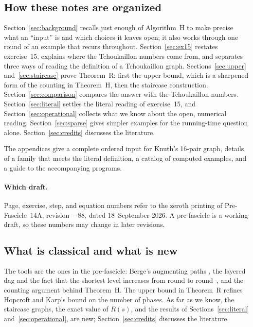 \subsection*{How these notes are organized}

Section~\ref{sec:background} recalls just enough of Algorithm~H to make
precise what an ``input'' is and which choices it leaves open; it
also works through one round of an example that recurs throughout.
Section~\ref{sec:ex15} restates exercise~15, explains where the
Tchoukaillon numbers come from, and separates three ways of reading the
definition of a Tchoukaillon graph. Sections~\ref{sec:upper}
and~\ref{sec:staircase} prove Theorem~R: first the upper bound, which is
a sharpened form of the counting in Theorem~H, then the staircase
construction. Section~\ref{sec:comparison} compares the answer with the
Tchoukaillon numbers. Section~\ref{sec:literal} settles the literal
reading of exercise~15, and Section~\ref{sec:operational} collects what
we know about the open, numerical reading. Section~\ref{sec:sparse}
gives simpler examples for the running-time question alone.
Section~\ref{sec:credits} discusses the literature.

The appendices give a complete ordered input for Knuth's 16-pair graph,
details of a family that meets the literal definition, a catalog of
computed examples, and a guide to the accompanying programs.

\paragraph{Which draft.} Page, exercise, step, and equation numbers refer
to the zeroth printing of Pre-Fascicle~14A, revision~$-88$, dated
18~September 2026. A pre-fascicle is a working draft, so these numbers may
change in later revisions.

\subsection*{What is classical and what is new}

The tools are the ones in the pre-fascicle: Berge's augmenting paths
\cite{Berge}, the layered dag and the fact that the shortest level
increases from round to round~\cite{HK}, and the counting argument
behind Theorem~H. The upper bound in Theorem~R refines Hopcroft and Karp's
bound on the number of phases. As far as we know, the staircase graphs,
the exact value of $R(s)$, and the results of Sections~\ref{sec:literal}
and~\ref{sec:operational}, are new; Section~\ref{sec:credits} discusses
the literature.
